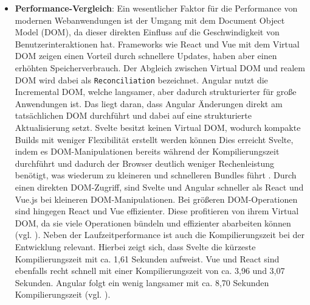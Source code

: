 \documentclass[oneside]{ausarbeitung}
\begin{document}
\begin{itemize}
\item \textbf{Performance-Vergleich}: 
Ein wesentlicher Faktor für die Performance von modernen Webanwendungen ist der Umgang mit dem Document Object Model (DOM), da dieser direkten Einfluss auf die Geschwindigkeit von Benutzerinteraktionen hat. 
Frameworks wie React und Vue mit dem Virtual DOM zeigen einen Vorteil durch schnellere Updates, haben aber einen erhöhten Speicherverbrauch. Der Abgleich zwischen Virtual DOM und realem DOM wird dabei als \texttt{Reconciliation} bezeichnet. Angular nutzt die Incremental DOM, welche langsamer, aber dadurch strukturierter für große Anwendungen ist. Das liegt daran, dass Angular Änderungen direkt am tatsächlichen DOM durchführt und dabei auf eine strukturierte Aktualisierung setzt. Svelte besitzt keinen Virtual DOM, wodurch kompakte Builds mit weniger Flexibilität erstellt werden können\parencite[S.61]{js-framework-comparison}
Dies erreicht Svelte, indem es DOM-Manipulationen bereits während der Kompilierungszeit durchführt und dadurch der Browser deutlich weniger Rechenleistung benötigt, was wiederum zu kleineren und schnelleren Bundles führt \parencite[S.26]{comparison-frameworks-scalable-apps}. Durch einen direkten DOM-Zugriff, sind Svelte und Angular schneller als React und Vue.js bei kleineren DOM-Manipulationen. Bei größeren DOM-Operationen sind hingegen React und Vue effizienter. Diese profitieren von ihrem Virtual DOM, da sie viele Operationen bündeln und effizienter abarbeiten können (vgl. \autocite[S.60-62]{js-framework-comparison}). 
Neben der Laufzeitperformance ist auch die Kompilierungszeit bei der Entwicklung relevant. Hierbei zeigt sich, dass Svelte die kürzeste  Kompilierungszeit mit ca. 1,61 Sekunden aufweist. Vue und React sind ebenfalls recht schnell mit einer Kompilierungszeit von ca. 3,96 und 3,07 Sekunden. Angular folgt ein wenig langsamer mit ca. 8,70 Sekunden Kompilierungszeit (vgl. \autocite[S.65]{js-framework-comparison}).
    

\end{itemize}
\end{document}
